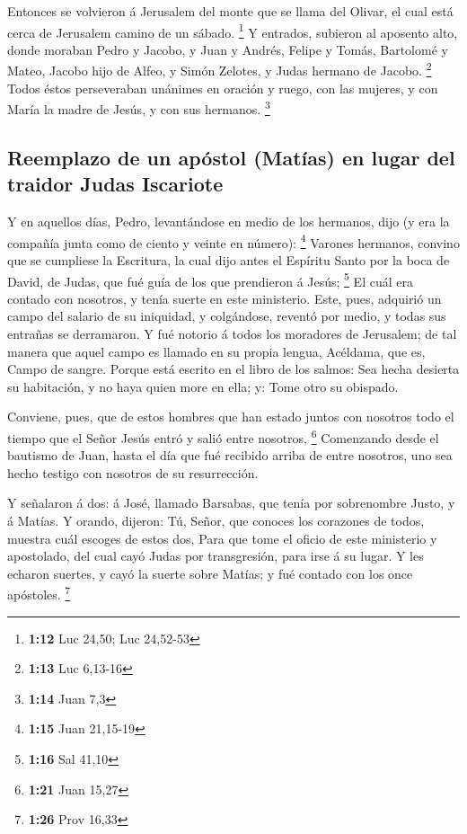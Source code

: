  Entonces se volvieron á Jerusalem del monte que se llama
del Olivar, el cual está cerca de Jerusalem camino de un sábado.
\footnote{\textbf{1:12} Luc 24,50; Luc 24,52-53}  Y
entrados, subieron al aposento alto, donde moraban Pedro y Jacobo, y
Juan y Andrés, Felipe y Tomás, Bartolomé y Mateo, Jacobo hijo de Alfeo,
y Simón Zelotes, y Judas hermano de Jacobo. \footnote{\textbf{1:13} Luc
  6,13-16}  Todos éstos perseveraban unánimes en oración y
ruego, con las mujeres, y con María la madre de Jesús, y con sus
hermanos. \footnote{\textbf{1:14} Juan 7,3}

\hypertarget{reemplazo-de-un-apuxf3stol-matuxedas-en-lugar-del-traidor-judas-iscariote}{%
\subsection{Reemplazo de un apóstol (Matías) en lugar del traidor Judas
Iscariote}\label{reemplazo-de-un-apuxf3stol-matuxedas-en-lugar-del-traidor-judas-iscariote}}

 Y en aquellos días, Pedro, levantándose en medio de los
hermanos, dijo (y era la compañía junta como de ciento y veinte en
número): \footnote{\textbf{1:15} Juan 21,15-19}  Varones
hermanos, convino que se cumpliese la Escritura, la cual dijo antes el
Espíritu Santo por la boca de David, de Judas, que fué guía de los que
prendieron á Jesús; \footnote{\textbf{1:16} Sal 41,10}  El
cuál era contado con nosotros, y tenía suerte en este ministerio.
 Este, pues, adquirió un campo del salario de su iniquidad,
y colgándose, reventó por medio, y todas sus entrañas se derramaron.
 Y fué notorio á todos los moradores de Jerusalem; de tal
manera que aquel campo es llamado en su propia lengua, Acéldama, que es,
Campo de sangre.  Porque está escrito en el libro de los
salmos: Sea hecha desierta su habitación, y no haya quien more en ella;
y: Tome otro su obispado.

 Conviene, pues, que de estos hombres que han estado juntos
con nosotros todo el tiempo que el Señor Jesús entró y salió entre
nosotros, \footnote{\textbf{1:21} Juan 15,27}  Comenzando
desde el bautismo de Juan, hasta el día que fué recibido arriba de entre
nosotros, uno sea hecho testigo con nosotros de su resurrección.

 Y señalaron á dos: á José, llamado Barsabas, que tenía por
sobrenombre Justo, y á Matías.  Y orando, dijeron: Tú,
Señor, que conoces los corazones de todos, muestra cuál escoges de estos
dos,  Para que tome el oficio de este ministerio y
apostolado, del cual cayó Judas por transgresión, para irse á su lugar.
 Y les echaron suertes, y cayó la suerte sobre Matías; y
fué contado con los once apóstoles. \footnote{\textbf{1:26} Prov 16,33}

